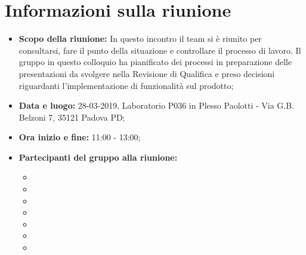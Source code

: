 \clearpage
\section{Informazioni sulla riunione}
\begin{itemize}
	\item \textbf {Scopo della riunione:} In questo incontro il team si è riunito per consultarsi, fare il punto della situazione e controllare il processo di lavoro. Il gruppo in questo colloquio ha pianificato dei processi in preparazione delle presentazioni da svolgere nella Revisione di Qualifica e preso decisioni riguardanti l'implementazione di funzionalità sul prodotto;
	\item \textbf {Data e luogo:} 28-03-2019, Laboratorio P036 in Plesso Paolotti - Via G.B. Belzoni 7, 35121 Padova PD;
	\item \textbf {Ora inizio e fine:} 11:00 - 13:00;
	\item \textbf {Partecipanti del gruppo alla riunione:} 
		 \begin{itemize}
			\item \sonia
			\item \pardeep
			\item \luca
			\item \matteo
			\item \alberto
			\item \alessandro
			\item \andrea
		\end{itemize}
\end{itemize}